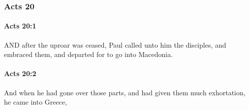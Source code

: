 	\subsubsection{Acts 20} %
		\label{ACTS-20}
		
		\paragraph{Acts 20:1} %
			\label{ACTS-20-1}

			AND after the uproar was ceased, Paul called unto him the disciples, and embraced them, and departed for to go into Macedonia.

			\begin{framed}
			\scriptsize
				\begin{compactdesc}
					\item[SBLG] 
				\end{compactdesc}
			\end{framed}

		\paragraph{Acts 20:2} %
			\label{ACTS-20-2}

			And when he had gone over those parts, and had given them much exhortation, he came into Greece,

